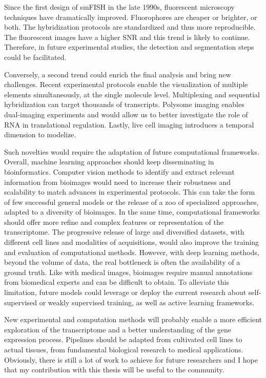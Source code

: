 Since the first design of \ac{smFISH} in the late 1990s, fluorescent microscopy techniques have dramatically improved.
Fluorophores are cheaper or brighter, or both.
The hybridization protocols are standardized and thus more reproducible.
The fluorescent images have a higher \ac{SNR} and this trend is likely to continue.
Therefore, in future experimental studies, the detection and segmentation steps could be facilitated.

Conversely, a second trend could enrich the final analysis and bring new challenges.
Recent experimental protocols enable the visualization of multiple elements simultaneously, at the single molecule level.
Multiplexing and sequential hybridization can target thousands of transcripts.
Polysome imaging enables dual-imaging experiments and would allow us to better investigate the role of \ac{RNA} in translational regulation.
Lastly, live cell imaging introduces a temporal dimension to modelize.

Such novelties would require the adaptation of future computational frameworks.
Overall, machine learning approaches should keep disseminating in bioinformatics.
Computer vision methods to identify and extract relevant information from bioimages would need to increase their robustness and scalability to match advances in experimental protocols.
This can take the form of few successful general models or the release of a zoo of specialized approaches, adapted to a diversity of bioimages.
In the same time, computational frameworks should offer more refine and complex features or representation of the transcriptome.
The progressive release of large and diversified datasets, with different cell lines and modalities of acquisitions, would also improve the training and evaluation of computational methods.
However, with deep learning methods, beyond the volume of data, the real bottleneck is often the availability of a ground truth.
Like with medical images, bioimages require manual annotations from biomedical experts and can be difficult to obtain.
To alleviate this limitation, future models could leverage or deploy the current research about self-supervised or weakly supervised training, as well as active learning frameworks.

New experimental and computation methods will probably enable a more efficient exploration of the transcriptome and a better understanding of the gene expression process.
Pipelines should be adapted from cultivated cell lines to actual tissues, from fundamental biological research to medical applications.
Obviously, there is still a lot of work to achieve for future researchers and I hope that my contribution with this thesis will be useful to the community.

